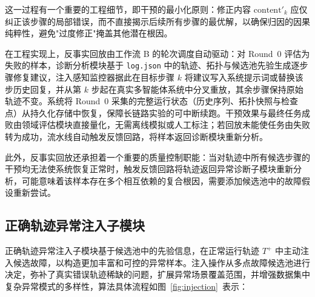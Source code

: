 这一过程有一个重要的工程细节，即干预的最小化原则：修正内容 $\mathrm{content}'_k$ 应仅纠正该步骤的局部错误，而不直接揭示后续所有步骤的最优解，以确保归因的因果纯粹性，避免"过度修正"掩盖其他潜在根因。

在工程实现上，反事实回放由工作流 B 的轮次调度自动驱动：对 Round~0 评估为失败的样本，诊断分析模块基于 \texttt{log.json} 中的轨迹、拓扑与候选池先验生成逐步骤修复建议，注入感知监控器据此在目标步骤 $k$ 将建议写入系统提示词或替换该步历史回复，并从第 $k$ 步起在真实多智能体系统中分叉重放，其余步骤保持原始轨迹不变。系统将 Round~0 采集的完整运行状态（历史序列、拓扑快照与检查点）从持久化存储中恢复，保障长链路实验的可中断续跑。干预效果与最终任务成败由领域评估模块直接量化，无需离线模拟或人工标注；若回放未能使任务由失败转为成功，流水线自动触发反馈回路，将样本返回诊断模块重新分析。
 
此外，反事实回放还承担着一个重要的质量控制职能：当对轨迹中所有候选步骤的干预均无法使系统恢复正常时，触发反馈回路将轨迹返回异常诊断子模块重新分析，可能意味着该样本存在多个相互依赖的复合根因，需要添加候选池中的故障假设重新尝试。
 
\subsection{正确轨迹异常注入子模块}
正确轨迹异常注入子模块基于候选池中的先验信息，在正常运行轨迹 $T^+$ 中主动注入候选故障，以构造更加丰富和可控的异常样本。注入操作从多点故障候选池进行决定，弥补了真实错误轨迹稀缺的问题，扩展异常场景覆盖范围，并增强数据集中复杂异常模式的多样性，算法具体流程如图~\ref{fig:injection}~表示：


